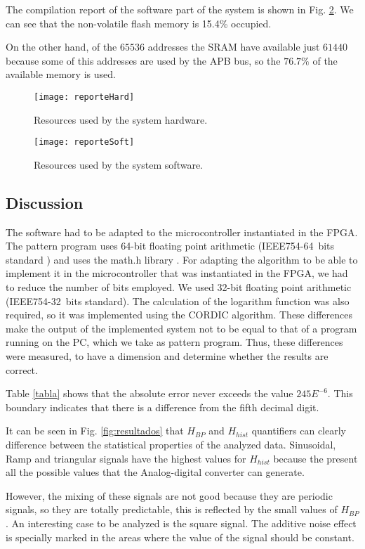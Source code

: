 The compilation report of the software part of the system is shown in Fig. \ref{fig:soft}. We can see that the non-volatile flash memory is 15.4\% occupied. 

On the other hand, of the $65536$ addresses the SRAM have available just $61440$ because some of this addresses are used by the APB bus, so the $76.7\%$ of the available memory is used.
%
\begin{figure}[htb]
\centering\texttt{[image: reporteHard]}
\caption{Resources used by the system hardware.}\label{fig:hard}
\end{figure}

\begin{figure}[htb]
\centering\texttt{[image: reporteSoft]}
\caption{Resources used by the system software.}\label{fig:soft}
\end{figure}

\subsection{Discussion}
\label{sec:discusion}
%
The software had to be adapted to the microcontroller instantiated in the FPGA. 
The pattern program uses 64-bit floating point arithmetic (IEEE754-64~bits standard ) and uses the math.h library \cite{Mathe}.
For adapting the algorithm to be able to implement it in the  microcontroller that was instantiated in the FPGA, we had to reduce the number of bits employed. We used 32-bit floating point arithmetic (IEEE754-32~bits standard). The calculation of the logarithm function was also required, so it was implemented using the CORDIC algorithm. 
These differences make the output of the implemented system not to be equal to that of a program running on the PC, which we take as pattern program. Thus, these differences were measured, to have a dimension and determine whether the results are correct.

Table \ref{tabla} shows that the absolute error never exceeds the value $245E^{-6}$. This boundary indicates that there is a difference from the fifth decimal digit.

It can be seen in Fig. \ref{fig:resultados} that $H_{BP}$ and $H_{hist}$ quantifiers can clearly  difference between the statistical properties of the analyzed data.
Sinusoidal, Ramp and triangular signals have the highest values for $H_{hist}$ because the present all the possible values that the Analog-digital converter can generate.

However, the mixing of these signals are not good because they are periodic signals, so they are totally predictable, this is reflected by the small values of $H_{BP}$.
An interesting case to be analyzed is the square signal. The additive noise effect is specially marked in the areas where the value of the signal should be constant.

